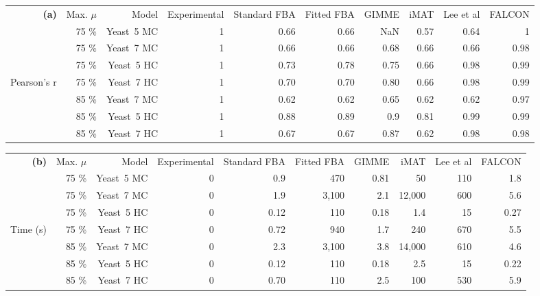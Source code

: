 \begin{table*}
\begin{center}
\small
\begin{tabular}{rrrrrrrrrr}
\textbf{(a)} \hspace{1.2cm} & Max. $\mu$ & Model & Experimental & 
  Standard FBA & Fitted FBA & GIMME & iMAT & Lee et al & FALCON\\
 & 75 \%& Yeast~5 MC & 1 & 0.66 & 0.66 & NaN  & 0.57 & 0.64 & 1 \\
 & 75 \%& Yeast~7 MC & 1 & 0.66 & 0.66 & 0.68 & 0.66 & 0.66 & 0.98\\
 & 75 \%& Yeast~5 HC & 1 & 0.73 & 0.78 & 0.75 & 0.66 & 0.98 & 0.99\\
Pearson's r  
 & 75 \%& Yeast~7 HC & 1 & 0.70 & 0.70 & 0.80 & 0.66 & 0.98 & 0.99\\
 & 85 \%& Yeast~7 MC & 1 & 0.62 & 0.62 & 0.65 & 0.62 & 0.62 & 0.97\\
 & 85 \%& Yeast~5 HC & 1 & 0.88 & 0.89 & 0.9  & 0.81 & 0.99 & 0.99\\
 & 85 \%& Yeast~7 HC & 1 & 0.67 & 0.67 & 0.87 & 0.62 & 0.98 & 0.98\\
\end{tabular}
\begin{tabular}{rrrrrrrrrr}
\textbf{(b)} \hspace{1.2cm} & Max. $\mu$ & Model & Experimental & 
  Standard FBA & Fitted FBA & GIMME & iMAT & Lee et al & FALCON\\
 & 75 \%& Yeast~5 MC & 0 & 0.9  & 470   & 0.81  & 50     & 110 & 1.8 \\
 & 75 \%& Yeast~7 MC & 0 & 1.9  & 3,100 & 2.1   & 12,000 & 600 & 5.6 \\
 & 75 \%& Yeast~5 HC & 0 & 0.12 & 110   & 0.18  & 1.4    & 15  & 0.27\\
Time (s) 
 & 75 \%& Yeast~7 HC & 0 & 0.72 & 940   & 1.7   & 240    & 670 & 5.5 \\
 & 85 \%& Yeast~7 MC & 0 & 2.3  & 3,100 & 3.8   & 14,000 & 610 & 4.6 \\
 & 85 \%& Yeast~5 HC & 0 & 0.12 & 110   & 0.18  & 2.5    & 15  & 0.22\\
 & 85 \%& Yeast~7 HC & 0 & 0.70 & 110   & 2.5   & 100    & 530 & 5.9\\
\end{tabular}
\end{center}
\caption{Performance of FALCON and other CBM methods for predicting
yeast exometabolic fluxes in two growth conditions with highly (HC)
and minimally (MC) constrained models \textbf{(a)} and associated
timing analysis \textbf{(b)}. For Lee et al. and FALCON methods, the
mean time for a single run of the method is listed; all other methods
did not have any stochasticity employed. Values are shown in two
significant figures. Method descriptions can be found in
\protect\citealt{Lee2012}.}
\label{tab:FalcPerf}
\end{table*}

